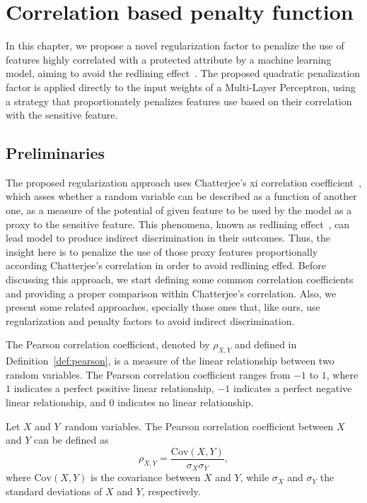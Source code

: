 \chapter{Correlation based penalty function}

In this chapter, we propose a novel regularization factor to penalize the use of features highly correlated with a protected attribute by a machine learning model, aiming to avoid the redlining effect~\citep{Pedreschi2008}. The proposed quadratic penalization factor is applied directly to the input weights of a Multi-Layer Perceptron, using a strategy that proportionately penalizes features use based on their correlation with the sensitive feature.

\section{Preliminaries}

The proposed regularization approach uses Chatterjee's xi correlation coefficient~\cite{chatterjee2020new}, which asses whether a random variable can be described as a function of another one, as a measure of the potential of given feature to be used by the model as a proxy to the sensitive feature. This phenomena, known as redlining effect~\citep{Pedreschi2008}, can lead model to produce indirect discrimination in their outcomes. Thus, the insight here is to penalize the use of those proxy features proportionally according Chatterjee's correlation in order to avoid redlining effed. Before discussing this approach, we start defining some common correlation coefficients and providing a proper comparison within Chatterjee's correlation. Also, we present some related approaches, specially those ones that, like ours, use regularization and penalty factors to avoid indirect discrimination.

The Pearson correlation coefficient, denoted by $\rho_{X,Y}$ and defined in Definition~\ref{def:pearson}, is a measure of the linear relationship between two random variables. The Pearson correlation coefficient ranges from $-1$ to $1$, where $1$ indicates a perfect positive linear relationship, $-1$ indicates a perfect negative linear relationship, and $0$ indicates no linear relationship.

\begin{definition}\label{def:pearson}
Let  $X$ and $Y$\ random variables. The Pearson correlation coefficient between $X$ and $Y$ can be defined as  
\begin{equation}
\rho_{X,Y} = \frac{\mathrm{Cov}(X, Y)}{\sigma_X \sigma_Y},
\end{equation}
where $\mathrm{Cov}(X, Y)$ is the covariance between $X$ and $Y$, while $\sigma_X$ and $\sigma_Y$ the standard deviations of $X$ and $Y$, respectively. 
\end{definition}

